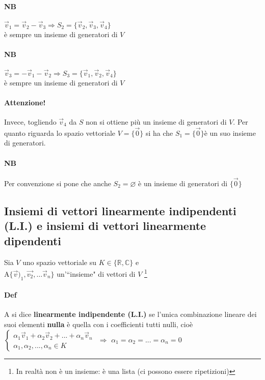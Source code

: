 \begin{enumerate}
        \paragraph{NB} $\vec{v}_1=\vec{v}_2-\vec{v}_3\Longrightarrow S_2=\{\vec{v}_2, \vec{v}_3, \vec{v}_4\}$
        \\è sempre un insieme di generatori di $V$
        \color{green}
        \paragraph{NB} $\vec{v}_3=-\vec{v}_1-\vec{v}_2\Longrightarrow S_3=\{\vec{v}_1, \vec{v}_2, \vec{v}_4\}$
        \\è sempre un insieme di generatori di $V$
        \color{red}
        \paragraph{Attenzione!} Invece, togliendo $\vec{v}_4$ da $S$ non si ottiene più un insieme
        di generatori di $V$.
        \color{black}
        Per quanto riguarda lo spazio vettoriale $V=\{\vec{0}\}$ si ha che 
        $S_1=\{\vec{0}\}$è un suo insieme di generatori. 
        \paragraph{NB} Per convenzione si pone che anche $S_2=\varnothing$ è un insieme di 
        generatori di $\{\vec{0}\}$
\end{enumerate}

\subsection{Insiemi di vettori linearmente indipendenti (L.I.) e 
insiemi di vettori linearmente dipendenti}
Sia $V$ uno spazio vettoriale su $K\in \{\mathbb{R}, \mathbb{C}\}$
e \\
A$\{\vec{v})_1, \vec{v_2},\dots \vec{v}_n\}$ un'``insieme" di vettori di $V$
\footnote{In realtà non è un insieme: è una lista (ci possono essere ripetizioni)}\\
\paragraph{Def}A si dice \textbf{linearmente indipendente (L.I.)} 
se l'unica combinazione lineare dei suoi elementi \textbf{nulla} è quella
con i coefficienti tutti nulli, cioè\\

$
\begin{cases}
\alpha_1\vec{v}_1+\alpha_2\vec{v}_2+...+\alpha_n\vec{v}_n\\
\alpha_1,\alpha_2,...,\alpha_n\in K
\end{cases}
$
$\Longrightarrow$
$\alpha_1=\alpha_2=...=\alpha_n=0$

